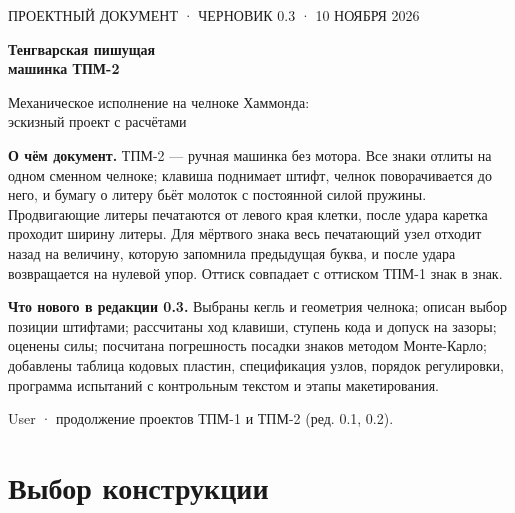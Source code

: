 


\begin{titlepage}
\vspace*{18mm}
{\sffamily\small ПРОЕКТНЫЙ ДОКУМЕНТ · ЧЕРНОВИК 0.3 · 10 НОЯБРЯ 2026}\par
\vspace{8mm}
{\sffamily\bfseries\fontsize{26}{30}\selectfont Тенгварская пишущая\\[2pt] машинка ТПМ-2}\par
\vspace{4mm}
{\large Механическое исполнение на челноке Хаммонда:\\ эскизный проект с расчётами}\par
\vspace{14mm}
\begin{center}
\setlength\tgem{13.5mm}
\begin{tikzpicture}[x=\tgu,y=\tgu]

\end{tikzpicture}
\end{center}
\vspace{6mm}
\noindent\begin{minipage}{0.86\textwidth}\small
\textbf{О чём документ.} ТПМ-2 — ручная машинка без мотора. Все знаки отлиты на одном сменном челноке; клавиша поднимает штифт, челнок поворачивается до него, и бумагу о литеру бьёт молоток с постоянной силой пружины. Продвигающие литеры печатаются от левого края клетки, после удара каретка проходит ширину литеры. Для мёртвого знака весь печатающий узел отходит назад на величину, которую запомнила предыдущая буква, и после удара возвращается на нулевой упор. Оттиск совпадает с оттиском ТПМ-1 знак в знак.

\textbf{Что нового в редакции 0.3.} Выбраны кегль и геометрия челнока; описан выбор позиции штифтами; рассчитаны ход клавиши, ступень кода и допуск на зазоры; оценены силы; посчитана погрешность посадки знаков методом Монте-Карло; добавлены таблица кодовых пластин, спецификация узлов, порядок регулировки, программа испытаний с контрольным текстом и этапы макетирования.
\end{minipage}
\vfill
{\small User · продолжение проектов ТПМ-1 и ТПМ-2 (ред. 0.1, 0.2).}
\end{titlepage}

\tableofcontents
\newpage

\section{Выбор конструкции}

